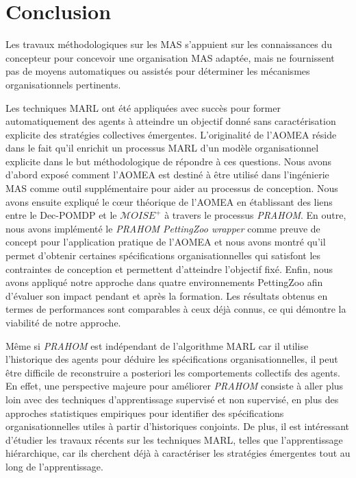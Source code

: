 \section{Conclusion}

Les travaux méthodologiques sur les MAS s'appuient sur les connaissances du concepteur pour concevoir une organisation MAS adaptée, mais ne fournissent pas de moyens automatiques ou assistés pour déterminer les mécanismes organisationnels pertinents.

Les techniques MARL ont été appliquées avec succès pour former automatiquement des agents à atteindre un objectif donné sans caractérisation explicite des stratégies collectives émergentes.
L'originalité de l'AOMEA réside dans le fait qu'il enrichit un processus MARL d'un modèle organisationnel explicite dans le but méthodologique de répondre à ces questions. Nous avons d'abord exposé comment l'AOMEA est destiné à être utilisé dans l'ingénierie MAS comme outil supplémentaire pour aider au processus de conception.
Nous avons ensuite expliqué le cœur théorique de l'AOMEA en établissant des liens entre le Dec-POMDP et le $\mathcal{M}OISE^+$ à travers le processus \emph{PRAHOM}.
En outre, nous avons implémenté le \emph{PRAHOM PettingZoo wrapper} comme preuve de concept pour l'application pratique de l'AOMEA et nous avons montré qu'il permet d'obtenir certaines spécifications organisationnelles qui satisfont les contraintes de conception et permettent d'atteindre l'objectif fixé.
Enfin, nous avons appliqué notre approche dans quatre environnements PettingZoo afin d'évaluer son impact pendant et après la formation. Les résultats obtenus en termes de performances sont comparables à ceux déjà connus, ce qui démontre la viabilité de notre approche.

Même si \emph{PRAHOM} est indépendant de l'algorithme MARL car il utilise l'historique des agents pour déduire les spécifications organisationnelles, il peut être difficile de reconstruire a posteriori les comportements collectifs des agents. En effet, une perspective majeure pour améliorer \emph{PRAHOM} consiste à aller plus loin avec des techniques d'apprentissage supervisé et non supervisé, en plus des approches statistiques empiriques pour identifier des spécifications organisationnelles utiles à partir d'historiques conjoints. De plus, il est intéressant d'étudier les travaux récents sur les techniques MARL, telles que l'apprentissage hiérarchique, car ils cherchent déjà à caractériser les stratégies émergentes tout au long de l'apprentissage.
